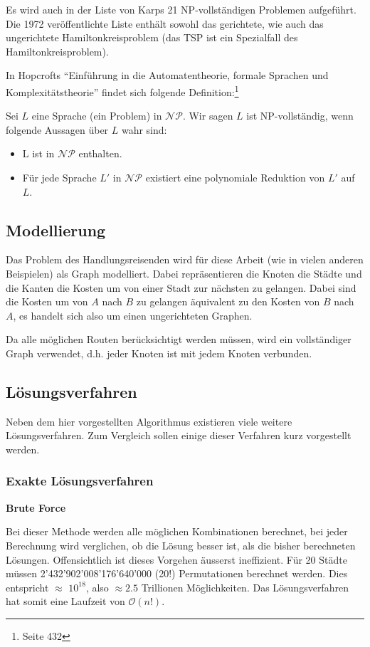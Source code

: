 \documentclass[11pt,a4paper]{article}
\begin{document}
Es wird auch in der Liste von Karps 21 NP-vollständigen Problemen aufgeführt. Die 1972 veröffentlichte Liste\cite{karp72} enthält sowohl das gerichtete, wie auch das ungerichtete Hamiltonkreisproblem (das TSP ist ein Spezialfall des Hamiltonkreisproblem). 

\medskip

In Hopcrofts "`Einführung in die Automatentheorie, formale Sprachen und Komplexitätstheorie"' findet sich folgende Definition:\footnote{\cite{hopcroft02} Seite 432}

Sei $L$ eine Sprache (ein Problem) in $\mathcal{NP}$. Wir sagen $L$ ist NP-vollständig, wenn folgende Aussagen über $L$ wahr sind:
\begin{itemize}
    \item L ist in $\mathcal{NP}$ enthalten.
    \item Für jede Sprache $L'$ in $\mathcal{NP}$ existiert eine polynomiale Reduktion von $L'$ auf $L$.
\end{itemize}

\subsection{Modellierung}
Das Problem des Handlungsreisenden wird für diese Arbeit (wie in vielen anderen Beispielen) als Graph modelliert. Dabei repräsentieren die Knoten die Städte und die Kanten die Kosten um von einer Stadt zur nächsten zu gelangen. Dabei sind die Kosten um von $A$ nach $B$ zu gelangen äquivalent zu den Kosten von $B$ nach $A$, es handelt sich also um einen ungerichteten Graphen.

Da alle möglichen Routen berücksichtigt werden müssen, wird ein vollständiger Graph verwendet, d.h. jeder Knoten ist mit jedem Knoten verbunden.

\subsection{Lösungsverfahren}
Neben dem hier vorgestellten Algorithmus existieren viele weitere Lösungsverfahren. Zum Vergleich sollen einige dieser Verfahren kurz vorgestellt werden.

\subsubsection{Exakte Lösungsverfahren}
\begin{flushleft}
\textbf{Brute Force}

Bei dieser Methode werden alle möglichen Kombinationen berechnet, bei jeder Berechnung wird verglichen, ob die Lösung besser ist, als die bisher berechneten Lösungen. Offensichtlich ist dieses Vorgehen äusserst ineffizient. Für 20 Städte müssen 2'432'902'008'176'640'000 (20!) Permutationen berechnet werden. Dies entspricht $\approx$ $10^{18}$, also $\approx2.5$ Trillionen Möglichkeiten. Das Lösungsverfahren hat somit eine Laufzeit von $\mathcal O(n!)$.

\end{flushleft}
\end{document}
